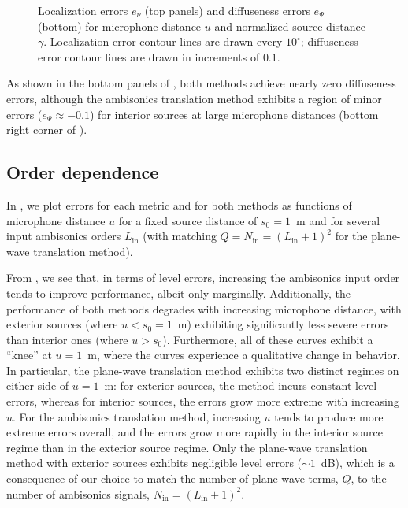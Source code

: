 \begin{figure}[tbp]
    	\caption[Localization and diffuseness contour plots for each extrapolation method.]{
	Localization errors $e_\nu$ (top panels) and diffuseness errors $e_\Psi$ (bottom) for microphone distance $u$ and normalized source distance $\gamma$.
  Localization error contour lines are drawn every $10^\circ$; diffuseness error contour lines are drawn in increments of $0.1$.}
    	\label{fig:07_Characterization_Extrapolation:Localization_Diffuseness_Errors}
\end{figure}


As shown in the bottom panels of , both methods achieve nearly zero diffuseness errors, although the ambisonics translation method exhibits a region of minor errors ($e_\Psi \approx -0.1$) for interior sources at large microphone distances (bottom right corner of ).

\subsection{Order dependence}
In , we plot errors for each metric and for both methods as functions of microphone distance $u$ for a fixed source distance of $s_0 = 1$~m and for several input ambisonics orders $L_\text{in}$ (with matching $Q = N_\text{in} = (L_\text{in} + 1)^2$ for the plane-wave translation method).

From , we see that, in terms of level errors, increasing the ambisonics input order tends to improve performance, albeit only marginally.
Additionally, the performance of both methods degrades with increasing microphone distance, with exterior sources (where $u < s_0 = 1$~m) exhibiting significantly less severe errors than interior ones (where $u > s_0$).
Furthermore, all of these curves exhibit a ``knee'' at $u = 1$~m, where the curves experience a qualitative change in behavior.
In particular, the plane-wave translation method exhibits two distinct regimes on either side of $u = 1$~m: for exterior sources, the method incurs constant level errors, whereas for interior sources, the errors grow more extreme with increasing $u$.
For the ambisonics translation method, increasing $u$ tends to produce more extreme errors overall, and the errors grow more rapidly in the interior source regime than in the exterior source regime.
Only the plane-wave translation method with exterior sources exhibits negligible level errors ($\sim1$~dB), which is a consequence of our choice to match the number of plane-wave terms, $Q$, to the number of ambisonics signals, $N_\text{in} = (L_\text{in} + 1)^2$.


